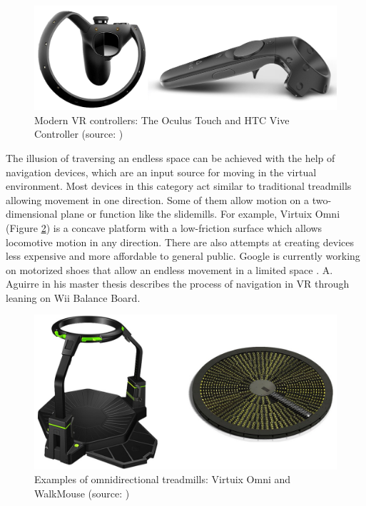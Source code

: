 \begin{figure}[th]
\centering
\includegraphics[width=1\textwidth]{img/modern_controllers.png}
\caption{Modern VR controllers: The Oculus Touch and HTC Vive Controller (source:  \cite{VR_TECHNOLOGY}\cite{VIVE_IMAGE})}
\label{fig:CONTROLLERS_IMAGE}
\end{figure}

The illusion of traversing an endless space can be achieved with the help of navigation devices, which are an input source for moving in the virtual environment. Most devices in this category act similar to traditional treadmills allowing movement in one direction. Some of them allow motion on a two-dimensional plane or function like the slidemills. For example, Virtuix Omni (Figure \ref{fig:VIRTUX_IMAGE}) is a concave platform with a low-friction surface which allows locomotive motion in any direction. There are also attempts at creating devices less expensive and more affordable to general public. Google is currently working on motorized shoes that allow an endless movement in a limited space \cite{VR_SHOES}. A. Aguirre in his master thesis \cite{JOYSTICK} describes the process of navigation in VR through leaning on Wii Balance Board.

\begin{figure}[th]
\centering
\includegraphics[width=1\textwidth]{img/vr_threadmills.png}
\caption{Examples of omnidirectional treadmills: Virtuix Omni and WalkMouse (source:  \cite{VR_TECHNOLOGY})}
\label{fig:VIRTUX_IMAGE}
\end{figure}

